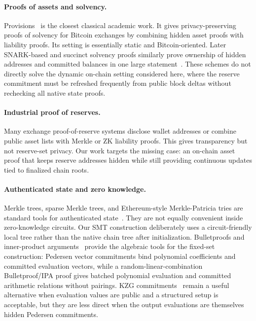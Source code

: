\documentclass[runningheads]{llncs}
\begin{document}
\paragraph{Proofs of assets and solvency.}
Provisions~\cite{Provisions15} is the closest classical academic work.  It gives privacy-preserving proofs of solvency for Bitcoin exchanges by combining hidden asset proofs with liability proofs.  Its setting is essentially static and Bitcoin-oriented.  Later SNARK-based and succinct solvency proofs similarly prove ownership of hidden addresses and committed balances in one large statement~\cite{Reddy22,Xiezhi24}.  These schemes do not directly solve the dynamic on-chain setting considered here, where the reserve commitment must be refreshed frequently from public block deltas without rechecking all native state proofs.

\paragraph{Industrial proof of reserves.}
Many exchange proof-of-reserve systems disclose wallet addresses or combine public asset lists with Merkle or ZK liability proofs.  This gives transparency but not reserve-set privacy.  Our work targets the missing case: an on-chain asset proof that keeps reserve addresses hidden while still providing continuous updates tied to finalized chain roots.

\paragraph{Authenticated state and zero knowledge.}
Merkle trees, sparse Merkle trees, and Ethereum-style Merkle-Patricia tries are standard tools for authenticated state~\cite{Merkle88,WoodYellowPaper,MPTdoc}.  They are not equally convenient inside zero-knowledge circuits.  Our SMT construction deliberately uses a circuit-friendly local tree rather than the native chain tree after initialization.  Bulletproofs and inner-product arguments~\cite{Bulletproofs18} provide the algebraic tools for the fixed-set construction: Pedersen vector commitments bind polynomial coefficients and committed evaluation vectors, while a random-linear-combination Bulletproof/IPA proof gives batched polynomial evaluation and committed arithmetic relations without pairings.  KZG commitments~\cite{KZG10} remain a useful alternative when evaluation values are public and a structured setup is acceptable, but they are less direct when the output evaluations are themselves hidden Pedersen commitments.
\end{document}
